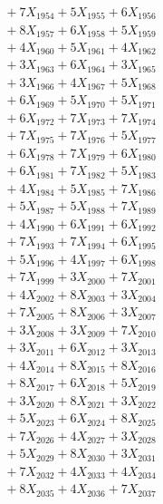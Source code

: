 \documentclass[a4paper,10pt]{article}
\begin{document}
{\begin{align}
&\;  + 7 X_{1954} + 5 X_{1955} + 6 X_{1956} \\[0.3ex]
&\;  + 8 X_{1957} + 6 X_{1958} + 5 X_{1959} \\[0.5ex]\allowbreak
&\;  + 4 X_{1960} + 5 X_{1961} + 4 X_{1962} \\[0.3ex]
&\;  + 3 X_{1963} + 6 X_{1964} + 3 X_{1965} \\[0.3ex]
&\;  + 3 X_{1966} + 4 X_{1967} + 5 X_{1968} \\[0.3ex]
&\;  + 6 X_{1969} + 5 X_{1970} + 5 X_{1971} \\[0.3ex]
&\;  + 6 X_{1972} + 7 X_{1973} + 7 X_{1974} \\[0.3ex]
&\;  + 7 X_{1975} + 7 X_{1976} + 5 X_{1977} \\[0.3ex]
&\;  + 6 X_{1978} + 7 X_{1979} + 6 X_{1980} \\[0.3ex]
&\;  + 6 X_{1981} + 7 X_{1982} + 5 X_{1983} \\[0.3ex]
&\;  + 4 X_{1984} + 5 X_{1985} + 7 X_{1986} \\[0.3ex]
&\;  + 5 X_{1987} + 5 X_{1988} + 7 X_{1989} \\[0.5ex]\allowbreak
&\;  + 4 X_{1990} + 6 X_{1991} + 6 X_{1992} \\[0.3ex]
&\;  + 7 X_{1993} + 7 X_{1994} + 6 X_{1995} \\[0.3ex]
&\;  + 5 X_{1996} + 4 X_{1997} + 6 X_{1998} \\[0.3ex]
&\;  + 7 X_{1999} + 3 X_{2000} + 7 X_{2001} \\[0.3ex]
&\;  + 4 X_{2002} + 8 X_{2003} + 3 X_{2004} \\[0.3ex]
&\;  + 7 X_{2005} + 8 X_{2006} + 3 X_{2007} \\[0.3ex]
&\;  + 3 X_{2008} + 3 X_{2009} + 7 X_{2010} \\[0.3ex]
&\;  + 3 X_{2011} + 6 X_{2012} + 3 X_{2013} \\[0.3ex]
&\;  + 4 X_{2014} + 8 X_{2015} + 8 X_{2016} \\[0.3ex]
&\;  + 8 X_{2017} + 6 X_{2018} + 5 X_{2019} \\[0.5ex]\allowbreak
&\;  + 3 X_{2020} + 8 X_{2021} + 3 X_{2022} \\[0.3ex]
&\;  + 5 X_{2023} + 6 X_{2024} + 8 X_{2025} \\[0.3ex]
&\;  + 7 X_{2026} + 4 X_{2027} + 3 X_{2028} \\[0.3ex]
&\;  + 5 X_{2029} + 8 X_{2030} + 3 X_{2031} \\[0.3ex]
&\;  + 7 X_{2032} + 4 X_{2033} + 4 X_{2034} \\[0.3ex]
&\;  + 8 X_{2035} + 4 X_{2036} + 7 X_{2037} \\[0.3ex]

\end{align}}
\end{document}
